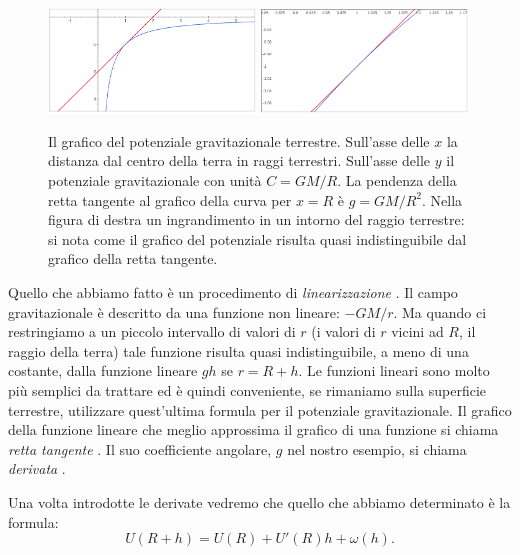 \begin{figure}
\includegraphics[width=0.49\textwidth]{derivata_00.png}\hfill%
\includegraphics[width=0.49\textwidth]{derivata_01.png}
\label{fig:derivata}
\caption{Il grafico del potenziale gravitazionale terrestre.
Sull'asse delle $x$ la distanza dal centro della terra in raggi terrestri.
Sull'asse delle $y$ il potenziale gravitazionale con unità $C=GM/R$.
La pendenza della retta tangente al grafico della curva per $x=R$ è $g=GM/R^2$.
Nella figura di destra un ingrandimento in un intorno del raggio terrestre:
si nota come il grafico del potenziale risulta quasi indistinguibile dal
grafico della retta tangente.}
\end{figure}

Quello che abbiamo fatto è un procedimento di \emph{linearizzazione}%
%
. 
Il campo gravitazionale è descritto da una funzione non lineare: $-GM/r$.
Ma quando ci restringiamo a un piccolo intervallo di valori di $r$ 
(i valori di $r$ vicini ad $R$, il raggio della terra) tale funzione 
risulta quasi indistinguibile, a meno di una costante, dalla funzione 
lineare $gh$ se $r=R+h$.
Le funzioni lineari sono molto più semplici da trattare ed è quindi conveniente, 
se rimaniamo sulla superficie terrestre, utilizzare quest'ultima formula per 
il potenziale gravitazionale.
Il grafico della funzione lineare che meglio approssima il grafico di una 
funzione si chiama \emph{retta tangente}%
%
. 
Il suo coefficiente angolare, $g$ nel nostro esempio, si chiama \emph{derivata}%
%
.

Una volta introdotte le derivate vedremo che quello che abbiamo
determinato è la formula:
\[
U(R+h) = U(R) + U'(R) h + \omega(h).
\]

